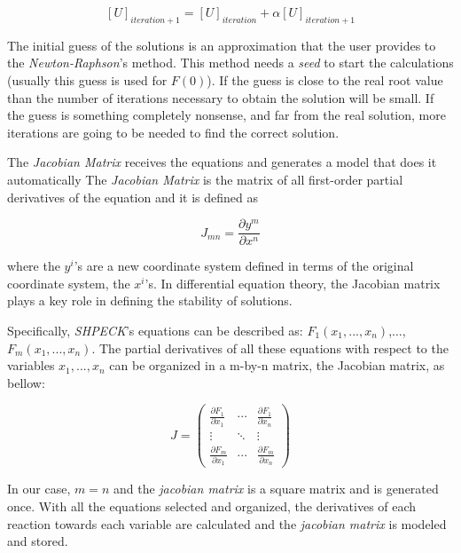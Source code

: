 \begin{equation}
\label{eq:CompositionCalculation}
[U]_{iteration+1} = [U]_{iteration} + \alpha [U]_{iteration+1}
\end{equation}


The initial guess of the solutions is an approximation that the user provides to the \emph{Newton-Raphson}'s method. This method needs a \emph{seed} to start the calculations (usually this guess is used for $F(0)$). 
If the guess is close to the real root value than the number of iterations necessary to obtain the solution will be small. If the guess is something completely nonsense, and far from the real solution, more iterations are going to be needed to find the correct solution.

The \emph{Jacobian Matrix} receives the equations and generates a model that does it automatically The \emph{Jacobian Matrix} is the matrix of all first-order partial derivatives of the equation and it is defined as

\begin{equation}
\label{eq:JacobianDefinition}
J_{mn} = \frac{\partial y^m}{\partial x^n}
\end{equation}

where the $y^i$'s are a new coordinate system defined in terms of the original coordinate system, the $x^i$'s. In differential equation theory, the Jacobian matrix plays a key role in defining the stability of solutions.

Specifically, \emph{SHPECK}'s equations can be described as: $F_1(x_1,..., x_n)$,...,$F_m(x_1,...,x_n)$. The partial derivatives of all these equations with respect to the variables $x_1,...,x_n$ can be organized in a m-by-n matrix, the Jacobian matrix, as bellow:

\begin{equation} 
J =
 \begin{pmatrix}
  \frac{\partial F_1}{\partial x_1} & \cdots & \frac{\partial F_1}{\partial x_n} \\
  \vdots  & \ddots & \vdots  \\
  \frac{\partial F_m}{\partial x_1} & \cdots &   \frac{\partial F_m}{\partial x_n}
 \end{pmatrix}
\end{equation}

In our case, $m = n$ and the \emph{jacobian matrix} is a square matrix and is generated once. With all the equations selected and organized, the derivatives of each reaction towards each variable are calculated and the \emph{jacobian matrix} is modeled and stored. 

